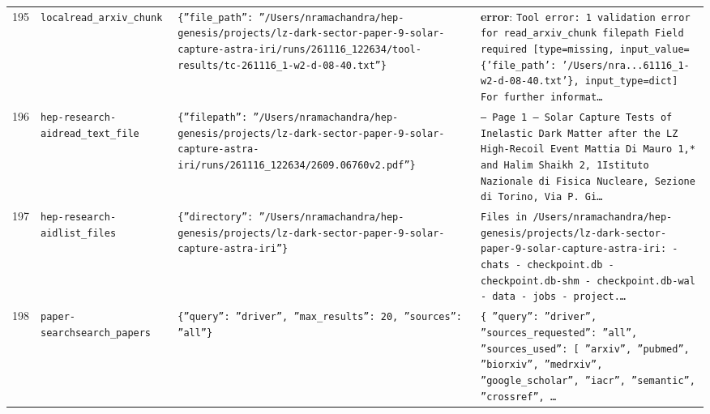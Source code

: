\documentclass[11pt,a4paper]{article}
\begin{document}
\begin{longtable}{@{}p{}p{}p{}p{}@{}}
195 & \texttt{local}\newline\texttt{read\_\allowbreak{}arxiv\_\allowbreak{}chunk} & \texttt{\{''file\_\allowbreak{}path'':\allowbreak{} ''/\allowbreak{}Users/\allowbreak{}nramachandra/\allowbreak{}hep-genesis/\allowbreak{}projects/\allowbreak{}lz-dark-sector-paper-9-solar-capture-astra-iri/\allowbreak{}runs/\allowbreak{}261116\_\allowbreak{}122634/\allowbreak{}tool-results/\allowbreak{}tc-261116\_\allowbreak{}1-w2-d-08-40.txt''\}\allowbreak{}} & \textbf{error}: \texttt{Tool error:\allowbreak{} 1 validation error for read\_\allowbreak{}arxiv\_\allowbreak{}chunk filepath   Field required [type=\allowbreak{}missing,\allowbreak{} input\_\allowbreak{}value=\allowbreak{}\{'file\_\allowbreak{}path':\allowbreak{} '/\allowbreak{}Users/\allowbreak{}nra...61116\_\allowbreak{}1-w2-d-08-40.txt'\}\allowbreak{},\allowbreak{} input\_\allowbreak{}type=\allowbreak{}dict]\allowbreak{}     For further informat\ldots{}\allowbreak{}} \\
196 & \texttt{hep-research-aid}\newline\texttt{read\_\allowbreak{}text\_\allowbreak{}file} & \texttt{\{''filepath'':\allowbreak{} ''/\allowbreak{}Users/\allowbreak{}nramachandra/\allowbreak{}hep-genesis/\allowbreak{}projects/\allowbreak{}lz-dark-sector-paper-9-solar-capture-astra-iri/\allowbreak{}runs/\allowbreak{}261116\_\allowbreak{}122634/\allowbreak{}2609.06760v2.pdf''\}\allowbreak{}} & \texttt{--- Page 1 --- Solar Capture Tests of Inelastic Dark Matter after the LZ High-Recoil Event Mattia Di Mauro 1,\allowbreak{}* and Halim Shaikh 2,\allowbreak{}\dag{}\allowbreak{} 1Istituto Nazionale di Fisica Nucleare,\allowbreak{} Sezione di Torino,\allowbreak{} Via P. Gi\ldots{}\allowbreak{}} \\
197 & \texttt{hep-research-aid}\newline\texttt{list\_\allowbreak{}files} & \texttt{\{''directory'':\allowbreak{} ''/\allowbreak{}Users/\allowbreak{}nramachandra/\allowbreak{}hep-genesis/\allowbreak{}projects/\allowbreak{}lz-dark-sector-paper-9-solar-capture-astra-iri''\}\allowbreak{}} & \texttt{Files in /\allowbreak{}Users/\allowbreak{}nramachandra/\allowbreak{}hep-genesis/\allowbreak{}projects/\allowbreak{}lz-dark-sector-paper-9-solar-capture-astra-iri:\allowbreak{}   - chats   - checkpoint.db   - checkpoint.db-shm   - checkpoint.db-wal   - data   - jobs   - project.\ldots{}\allowbreak{}} \\
198 & \texttt{paper-search}\newline\texttt{search\_\allowbreak{}papers} & \texttt{\{''query'':\allowbreak{} ''driver'',\allowbreak{} ''max\_\allowbreak{}results'':\allowbreak{} 20,\allowbreak{} ''sources'':\allowbreak{} ''all''\}\allowbreak{}} & \texttt{\{   ''query'':\allowbreak{} ''driver'',\allowbreak{}   ''sources\_\allowbreak{}requested'':\allowbreak{} ''all'',\allowbreak{}   ''sources\_\allowbreak{}used'':\allowbreak{} [     ''arxiv'',\allowbreak{}     ''pubmed'',\allowbreak{}     ''biorxiv'',\allowbreak{}     ''medrxiv'',\allowbreak{}     ''google\_\allowbreak{}scholar'',\allowbreak{}     ''iacr'',\allowbreak{}     ''semantic'',\allowbreak{}     ''crossref'',\allowbreak{}     \ldots{}\allowbreak{}} \\

\end{longtable}
\end{document}
